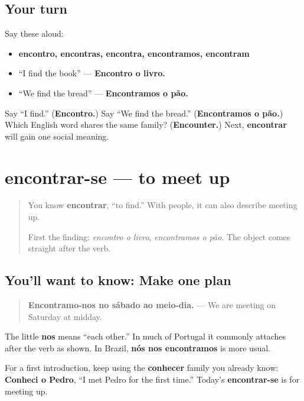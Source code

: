 \subsection*{Your turn}
Say these aloud:

\begin{itemize}
\raggedright
  \item \textbf{encontro, encontras, encontra, encontramos, encontram}
  \item “I find the book” — \textbf{Encontro o livro.}
  \item “We find the bread” — \textbf{Encontramos o pão.}
\end{itemize}

\begin{tcolorbox}[breakable,colback=teal!4,colframe=teal!35!black,title={Before you move on}]
Say “I find.” (\textbf{Encontro.}) Say “We find the bread.” (\textbf{Encontramos o pão.}) Which English word shares the same family? (\textbf{Encounter.}) Next, \textbf{encontrar} will gain one social meaning.
\end{tcolorbox}
\section[encontrar-se]{encontrar-se — to meet up}

\label{lesson:PT-C22-encontrar-meet}



\begin{quote}
You know \textbf{encontrar}, “to find.” With people, it can also describe meeting up.

First the finding: \emph{encontro o livro}, \emph{encontramos o pão}. The object comes straight after the verb.
\end{quote}

\subsection*{You'll want to know: Make one plan}
\begin{quote}
\textbf{Encontramo-nos no sábado ao meio-dia.} — We are meeting on Saturday at midday.
\end{quote}

The little \textbf{nos} means “each other.” In much of Portugal it commonly attaches after the verb as shown. In Brazil, \textbf{nós nos encontramos} is more usual.

For a first introduction, keep using the \textbf{conhecer} family you already know: \textbf{Conheci o Pedro}, “I met Pedro for the first time.” Today’s \textbf{encontrar-se} is for meeting up.

